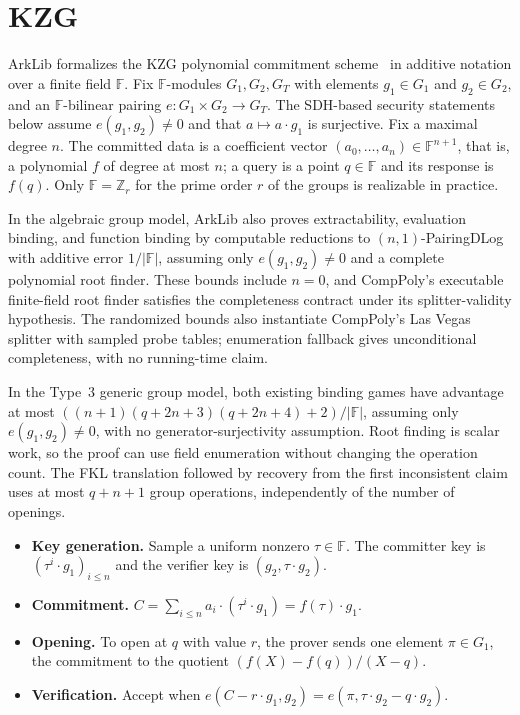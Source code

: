 
\section{KZG}\label{sec:kzg}

ArkLib formalizes the KZG polynomial commitment scheme~\cite{KZG10} in additive notation over a
finite field $\mathbb{F}$. Fix $\mathbb{F}$-modules $G_1,G_2,G_T$ with elements $g_1\in G_1$ and
$g_2\in G_2$, and an $\mathbb{F}$-bilinear pairing $e:G_1\times G_2\to G_T$. The SDH-based security
statements below assume $e(g_1,g_2)\neq 0$ and that $a\mapsto a\cdot g_1$ is surjective. Fix a maximal
degree $n$. The committed data is a coefficient vector $(a_0,\ldots,a_n)\in\mathbb{F}^{n+1}$,
that is, a polynomial $f$ of degree at most $n$; a query is a point $q\in\mathbb{F}$ and its
response is $f(q)$. Only $\mathbb{F}=\mathbb{Z}_r$ for the prime order $r$ of the groups is
realizable in practice.

In the algebraic group model, ArkLib also proves extractability, evaluation binding, and function
binding by computable reductions to $(n,1)$-PairingDLog with additive error $1/|\mathbb{F}|$,
assuming only $e(g_1,g_2)\neq 0$ and a complete polynomial root finder.
These bounds include $n=0$, and CompPoly's executable finite-field root finder satisfies the
completeness contract under its splitter-validity hypothesis.
The randomized bounds also instantiate CompPoly's Las Vegas splitter with sampled probe tables;
enumeration fallback gives unconditional completeness, with no running-time claim.

In the Type~3 generic group model, both existing binding games have advantage at most
$((n+1)(q+2n+3)(q+2n+4)+2)/|\mathbb{F}|$, assuming only $e(g_1,g_2)\neq 0$, with no
generator-surjectivity assumption. Root finding is scalar work, so the proof can use field
enumeration without changing the operation count.
The FKL translation followed by recovery from the first inconsistent claim uses at most
$q+n+1$ group operations, independently of the number of openings.

\begin{definition}\label{def:kzg}
\leanok
\begin{itemize}
  \item \textbf{Key generation.} Sample a uniform nonzero $\tau\in\mathbb{F}$. The committer key
    is $(\tau^i\cdot g_1)_{i\leq n}$ and the verifier key is $(g_2,\tau\cdot g_2)$.
  \item \textbf{Commitment.} $C=\sum_{i\leq n}a_i\cdot(\tau^i\cdot g_1)=f(\tau)\cdot g_1$.
  \item \textbf{Opening.} To open at $q$ with value $r$, the prover sends one element
    $\pi\in G_1$, the commitment to the quotient $(f(X)-f(q))/(X-q)$.
  \item \textbf{Verification.} Accept when $e(C-r\cdot g_1,g_2)=e(\pi,\tau\cdot g_2-q\cdot g_2)$.
\end{itemize}
\end{definition}


